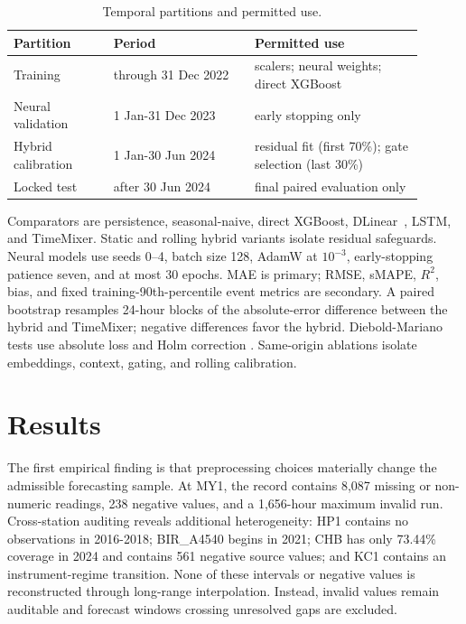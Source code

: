 \documentclass[sn-mathphys-num]{sn-jnl}
\begin{document}
\begin{table}[tbp]
\centering
\caption{Temporal partitions and permitted use.}
\label{tab:splits}
\small
\begin{tabular}{p{0.22\linewidth}p{0.31\linewidth}p{0.37\linewidth}}
\toprule
Partition & Period & Permitted use \\
\midrule
Training & through 31 Dec 2022 & scalers; neural weights; direct XGBoost \\
Neural validation & 1 Jan-31 Dec 2023 & early stopping only \\
Hybrid calibration & 1 Jan-30 Jun 2024 & residual fit (first 70\%); gate selection (last 30\%) \\
Locked test & after 30 Jun 2024 & final paired evaluation only \\
\bottomrule
\end{tabular}
\end{table}

Comparators are persistence, seasonal-naive, direct XGBoost,
DLinear~\cite{zeng2023dlinear}, LSTM, and TimeMixer. Static and rolling hybrid
variants isolate residual safeguards. Neural models use seeds 0--4, batch size
128, AdamW at \(10^{-3}\), early-stopping patience seven, and at most 30
epochs. MAE is primary; RMSE, sMAPE, \(R^2\), bias, and fixed
training-90th-percentile event metrics are secondary. A paired bootstrap
resamples 24-hour blocks of the absolute-error difference between the hybrid
and TimeMixer; negative differences favor the hybrid. Diebold-Mariano tests
use absolute loss and Holm correction
\cite{diebold1995accuracy}. Same-origin ablations isolate embeddings, context,
gating, and rolling calibration.

\section{Results}
\label{sec:results}

The first empirical finding is that preprocessing choices materially change
the admissible forecasting sample. At MY1, the record contains 8,087 missing
or non-numeric readings, 238 negative values, and a 1,656-hour maximum invalid
run. Cross-station auditing reveals additional heterogeneity: HP1 contains no
observations in 2016-2018; BIR\_A4540 begins in 2021; CHB has only 73.44\%
coverage in 2024 and contains 561 negative source values; and KC1 contains an
instrument-regime transition. None of these intervals or negative values is
reconstructed through long-range interpolation. Instead, invalid values
remain auditable and forecast windows crossing unresolved gaps are excluded.
\end{document}
